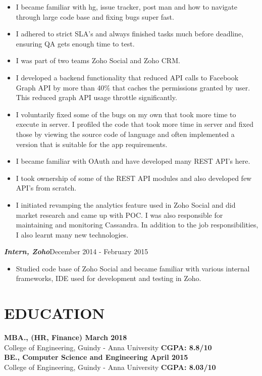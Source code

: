 \documentclass[11pt,a4paper]{article}
\begin{document}
\begin{itemize}[noitemsep]
\item I became familiar with hg, issue tracker, post man and how to navigate through large code base and fixing bugs super fast.  
\item I adhered to strict SLA's and always finished tasks much before deadline, ensuring QA gets enough time to test. 
\item I was part of two teams Zoho Social and Zoho CRM. 
\item I developed a backend functionality that reduced API calls to Facebook Graph API by more than 40\%  that caches the permissions granted by user. This reduced graph API usage throttle significantly. 
\item I voluntarily fixed some of the bugs on my own that took more time to execute in server. I profiled the code that took more time in server and fixed those by viewing the source code of language and often implemented a version that is suitable for the app requirements. 
\item I became familiar with OAuth and have developed many REST API's here. 
\item I took ownership of some of the REST API modules and also developed few API's from scratch. 
\item I initiated revamping the analytics feature used in Zoho Social and did  market research and came up with POC. I was also responsible for maintaining and monitoring Cassandra. In addition to the job responsibilities, I also learnt many new technologies.
\end{itemize}
\newpage
\emph{\textbf{Intern, Zoho}}{\hfill December 2014 - February 2015}
\begin{itemize}[noitemsep]
\item Studied code base of Zoho Social and became familiar with various internal frameworks, IDE used for development and testing in Zoho.
\end{itemize}
\section*{EDUCATION}
\textbf{MBA., (HR, Finance) {\hfill March 2018}}\\
College of Engineering, Guindy - Anna University {\hfill \textbf{CGPA: 8.8/10}}\\
\textbf{BE., Computer Science and Engineering {\hfill April 2015}}\\
College of Engineering, Guindy - Anna University {\hfill \textbf{CGPA: 8.03/10}}\\
\end{document}
